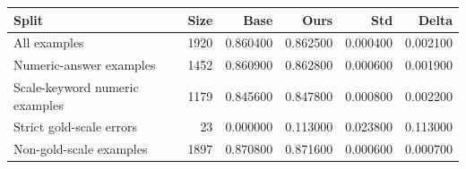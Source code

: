 \begin{tabular}{lrrrrr}
\toprule
Split & Size & Base & Ours & Std & Delta \\
\midrule
All examples & 1920 & 0.860400 & 0.862500 & 0.000400 & 0.002100 \\
Numeric-answer examples & 1452 & 0.860900 & 0.862800 & 0.000600 & 0.001900 \\
Scale-keyword numeric examples & 1179 & 0.845600 & 0.847800 & 0.000800 & 0.002200 \\
Strict gold-scale errors & 23 & 0.000000 & 0.113000 & 0.023800 & 0.113000 \\
Non-gold-scale examples & 1897 & 0.870800 & 0.871600 & 0.000600 & 0.000700 \\
\bottomrule
\end{tabular}
